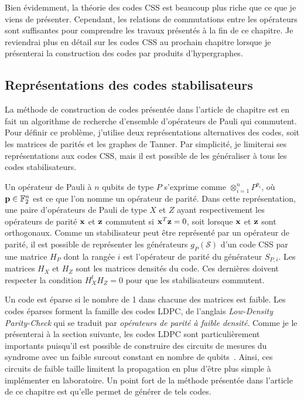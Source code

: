 Bien évidemment,
la théorie des codes CSS est beaucoup plus riche que ce que je viens de présenter.
Cependant,
les relations de commutations entre les opérateurs sont suffisantes pour comprendre
les travaux présentés à la fin de ce chapitre.
Je reviendrai plus en détail sur les codes CSS au prochain chapitre lorsque je présenterai
la construction des codes par produits d'hypergraphes.
 
\subsection{Représentations des codes stabilisateurs}
\label{sec:representations_codes}

La méthode de construction de codes présentée dans l'article de chapitre est en fait un algorithme
de recherche d'ensemble d'opérateurs de Pauli qui commutent.
Pour définir ce problème,
j'utilise deux représentations alternatives des codes, soit les matrices de parités et les graphes de Tanner.
Par simplicité,
je limiterai ses représentations aux codes CSS,
mais il est possible de les généraliser à tous les codes stabilisateurs.

Un opérateur de Pauli à $n$ qubits de type $P$ s'exprime comme $\otimes_{i=1}^{n} P^{p_i}$,
où $\vb p \in \mathbb{F}_{2}^{n}$ est ce que l'on nomme un opérateur de parité.
Dans cette représentation,
une paire d'opérateurs de Pauli de type $X$ et $Z$ ayant respectivement les opérateurs de parité $\vb x$ 
et $\vb z$ commutent si $\vb x^T \vb z = 0$,
soit lorsque $\vb x$ et $\vb z$ sont orthogonaux.
Comme un stabilisateur peut être représenté par un opérateur de parité,
il est possible de représenter les générateurs $g_P(\mathcal S)$ d'un code CSS
par une matrice $H_P$ dont la rangée $i$ est l'opérateur de parité du
générateur $S_{P, i}$.
Les matrices $H_X$ et $H_Z$ sont les matrices densités du code.
Ces dernières doivent respecter la condition $H_X^t H_Z = 0$ pour 
que les stabilisateurs commutent.

Un code est éparse si le nombre de 1 dans chacune des matrices est faible.
Les codes éparses forment la famille des codes LDPC,
de l'anglais \textit{Low-Density Parity-Check} qui se traduit par
\textit{opérateurs de parité à faible densité}.
Comme je le présenterai à la section suivante,
les codes LDPC sont particulièrement importants puisqu'il est possible de construire
des circuits de mesures du syndrome avec un faible surcout
constant en nombre de qubits~\cite{gottesman_fault-tolerant_2013}.
Ainsi,
ces circuits de faible taille limitent la propagation en plus d'être plus simple à 
implémenter en laboratoire.
Un point fort de la méthode présentée dans l'article de ce chapitre est qu'elle permet 
de générer de tels codes.

